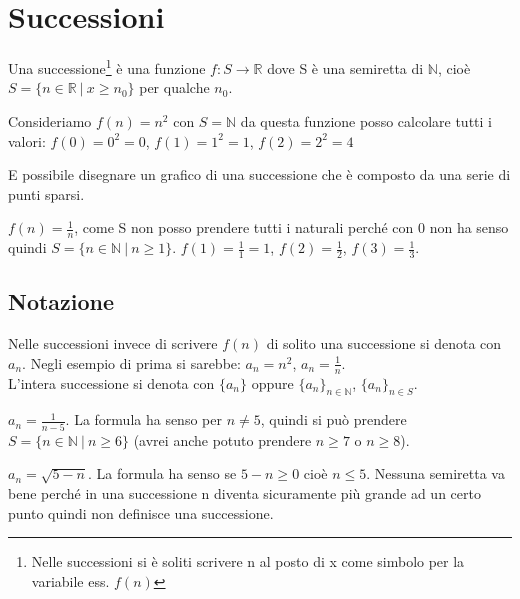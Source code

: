 \newpage
\section{Successioni}
\begin{definition}[Successione]
Una successione\footnote{Nelle successioni si è soliti scrivere n al posto di x come simbolo per la variabile ess. $f(n)$} è una funzione $f: S\to \mathbb{R}$ dove S è una semiretta di $\mathbb{N}$, cioè $S = \{n \in \mathbb{R}\:|\: x\geq n_0\}$ per qualche $n_0$.
\end{definition}

\begin{example}
Consideriamo $f(n) = n^2$ con $S = \mathbb{N}$ da questa funzione posso calcolare tutti i valori: $f(0) = 0^2 = 0$, $f(1) = 1^2 = 1$, $f(2) = 2^2 = 4$
\end{example}

\hspace{-15pt}E possibile disegnare un grafico di una successione che è composto da una serie di punti sparsi.

\begin{example}
$f(n) = \frac{1}{n}$, come S non posso prendere tutti i naturali perché con 0 non ha senso quindi $S = \{n \in \mathbb{N} \: |\: n \geq 1\}$.  $f(1) = \frac{1}{1}=1$, $f(2) = \frac{1}{2}$, $f(3) = \frac{1}{3}$.
\end{example}

\subsection{Notazione}
Nelle successioni invece di scrivere $f(n)$ di solito una successione si denota con $a_n$. Negli esempio di prima si sarebbe: $a_n = n^2$, $a_n = \frac{1}{n}$.\\
L'intera successione si denota con $\{a_n\}$ oppure $\{a_n\}_{n\in \mathbb{N}}$, $\{a_n\}_{n\in S}$.
\begin{example}
$a_n = \frac{1}{n-5}$. La formula ha senso per $n\neq 5$, quindi si può prendere $S = \{n \in \mathbb{N} \:|\: n\geq 6\}$ (avrei anche potuto prendere $n \geq 7$ o $n \geq 8$).
\end{example}

\begin{example}
$a_n = \sqrt{5 - n}$. La formula ha senso se $5-n \geq 0$ cioè $n \leq 5$. Nessuna semiretta va bene perché in una successione n diventa sicuramente più grande ad un certo punto quindi non definisce una successione.
\end{example}

